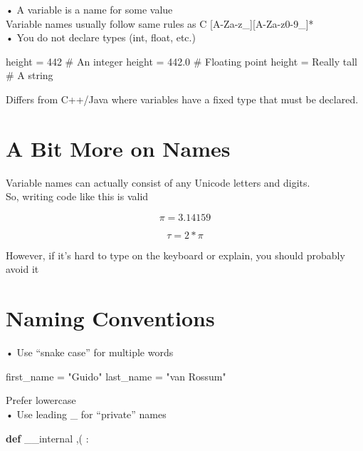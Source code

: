 \documentclass[
  letterpaper,
  DIV=11,
  numbers=noendperiod]{scrreprt}
\newenvironment{Shaded}{\begin{snugshade}}{\end{snugshade}}
\newcommand{\KeywordTok}[1]{\textcolor[rgb]{0.00,0.23,0.31}{\textbf{#1}}}
\newcommand{\NormalTok}[1]{\textcolor[rgb]{0.00,0.23,0.31}{#1}}
\begin{document}
• A variable is a name for some value\\
Variable names usually follow same rules as C
{[}A-Za-z\_{]}{[}A-Za-z0-9\_{]}*\\
• You do not declare types (int, float, etc.)

\begin{Shaded}
\begin{Highlighting}[]
\NormalTok{height = 442 \# An integer  }
\NormalTok{height = 442.0 \# Floating point  }
\NormalTok{height = \textquotesingle{}Really tall\textquotesingle{} \# A string }
\end{Highlighting}
\end{Shaded}

Differs from C++/Java where variables have a fixed type that must be
declared.


\chapter{A Bit More on Names}\label{a-bit-more-on-names}

Variable names can actually consist of any Unicode letters and digits.\\
So, writing code like this is valid

\[
\pi = 3. 1 4 1 5 9
\]

\[
\tau = 2 * \pi
\]

However, if it's hard to type on the keyboard or explain, you should
probably avoid it


\chapter{Naming Conventions}\label{naming-conventions}

• Use ``snake case'' for multiple words

\begin{Shaded}
\begin{Highlighting}[]
\NormalTok{first\_name = "Guido"  }
\NormalTok{last\_name = "van Rossum" }
\end{Highlighting}
\end{Shaded}

Prefer lowercase\\
• Use leading \_ for ``private'' names

\begin{Shaded}
\begin{Highlighting}[]
\KeywordTok{def}\NormalTok{ \_\_internal ,( : }
\end{Highlighting}
\end{Shaded}
\end{document}
